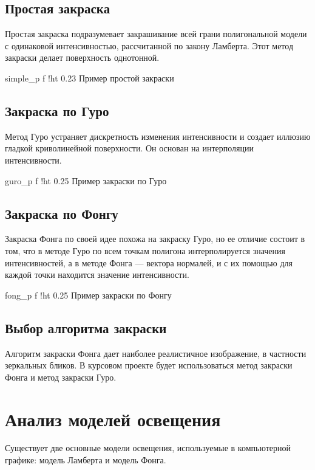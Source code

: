 \subsection{Простая закраска}

Простая закраска подразумевает закрашивание всей грани полигональной модели с одинаковой интенсивностью, рассчитанной по закону Ламберта.  
Этот метод закраски делает поверхность однотонной.  

    {simple_p}
    {f}
    {!ht}
    {0.23\textwidth}
    {Пример простой закраски}

\subsection{Закраска по Гуро}
Метод Гуро устраняет дискретность изменения интенсивности и создает
иллюзию гладкой криволинейной поверхности. Он основан на интерполяции интенсивности. 

    {guro_p}
    {f}
    {!ht}
    {0.25\textwidth}
    {Пример закраски по Гуро}

\subsection{Закраска по Фонгу}
Закраска Фонга по своей идее похожа на закраску Гуро, но ее отличие состоит в том, 
что в методе Гуро по всем точкам полигона интерполируется значения интенсивностей, 
а в методе Фонга --- вектора нормалей, и с их помощью для каждой точки находится значение интенсивности.

    {fong_p}
    {f}
    {!ht}
    {0.25\textwidth}
    {Пример закраски по Фонгу}

\subsection{Выбор алгоритма закраски}
Алгоритм закраски Фонга дает наиболее реалистичное изображение, в частности зеркальных бликов. 
В курсовом проекте будет использоваться метод закраски Фонга и метод закраски Гуро.

\newpage

\section{Анализ моделей освещения}

Существует две основные модели освещения, используемые в компьютерной графике: модель Ламберта и модель Фонга.  

